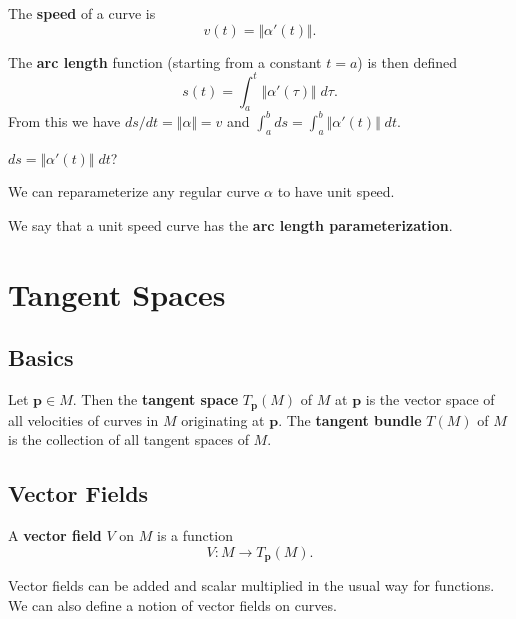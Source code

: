 \documentclass[twoside,10pt]{report}
\begin{document}
The \textbf{speed} of a curve is
\[
	v(t) = \Vert{\alpha'(t)}\Vert.
\] 

The \textbf{arc length} function (starting from a constant $t=a$) is then defined
\[
	s(t) = \int_{a}^{t} \Vert{\alpha'(\tau)}\Vert\;d\tau.
\] 
From this we have $ds/dt = \Vert{\alpha}\Vert=v$ and $\int_{a}^{b} ds = \int_{a}^{b} \Vert{\alpha'(t)}\Vert\;dt$.

{\color{red}$ds = \Vert{\alpha'(t)}\Vert\;dt$?}

\begin{thrm}[]
We can reparameterize any regular curve $\alpha$ to have unit speed.
\end{thrm}

We say that a unit speed curve has the \textbf{arc length parameterization}.


\chapter{Tangent Spaces}


\section{Basics}

\begin{defn}
	Let $\mathbf{p} \in M$. Then the \textbf{tangent space} $T_\mathbf{p}(M)$ of $M$ at $\mathbf{p}$ is the vector space of all velocities of curves in $M$ originating at $\mathbf{p}$. The \textbf{tangent bundle} $T( M)$ of $M$ is the collection of all tangent spaces of $M$.
\end{defn}


\section{Vector Fields}

\begin{defn}
	A \textbf{vector field} $V$ on $M$ is a function
	\[
		V:M \to T_{\mathbf{p}}(M).
	\] 
\end{defn}

Vector fields can be added and scalar multiplied in the usual way for functions. We can also define a notion of vector fields on curves.
\end{document}
